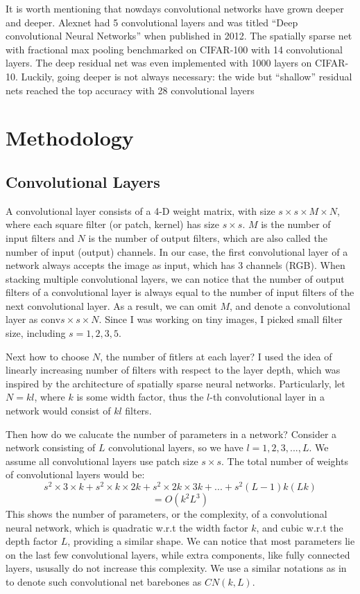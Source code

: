 \documentclass[conference]{IEEEtran}
\begin{document}
It is worth mentioning that nowdays convolutional networks have grown deeper and deeper. Alexnet had 5 convolutional layers and was titled ``Deep convolutional Neural Networks'' when published in 2012\cite{res}. The spatially sparse net with fractional max pooling benchmarked on CIFAR-100 with 14 convolutional layers\cite{fmp}. The deep residual net was even implemented with 1000 layers on CIFAR-10\cite{res}. Luckily, going deeper is not always necessary: the wide but ``shallow'' residual nets reached the top accuracy with 28 convolutional layers\cite{wide} 

\section{Methodology}
\subsection*{Convolutional Layers}
A convolutional layer consists of a 4-D weight matrix, with size $s\times s\times M \times N$, where each square filter (or patch, kernel) has size $s\times s$. $M$ is the number of input filters and $N$ is the number of output filters, which are also called the number of input (output) channels. In our case, the first convolutional layer of a network always accepts the image as input, which has 3 channels (RGB). When stacking multiple convolutional layers, we can notice that the number of output filters of a convolutional layer is always equal to the number of input filters of the next convolutional layer. As a result, we can omit $M$, and denote a convolutional layer as conv$s\times s \times N$. Since I was working on tiny images, I picked small filter size, including $s=1,2,3,5$. 

Next how to choose $N$, the number of fitlers at each layer? I used the idea of linearly increasing number of filters with respect to the layer depth, which was inspired by the architecture of spatially sparse neural networks\cite{sparse}. Particularly, let $N = kl$, where $k$ is some width factor, thus the $l$-th convolutional layer in a network would consist of $kl$ filters.

Then how do we calucate the number of parameters in a network? Consider a network consisting of $L$ convolutional layers, so we have $l=1,2,3,...,L$. We assume all convolutional layers use patch size $s\times s$. The total number of weights of convolutional layers would be:
$$s^2\times 3 \times k + s^2\times k \times 2k + s^2\times 2k \times 3k + ... + s^2 (L-1)k(Lk)$$ 
$$ = O(k^2L^3)$$
This shows the number of parameters, or the complexity, of a convolutional neural network, which is quadratic w.r.t the width factor $k$, and cubic w.r.t the depth factor $L$, providing a similar shape. We can notice that most parameters lie on the last few convolutional layers, while extra components, like fully connected layers, ususally do not increase this complexity. We use a similar notations as in \cite{sparse} to denote such convolutional net barebones as $CN(k, L)$.
\end{document}

